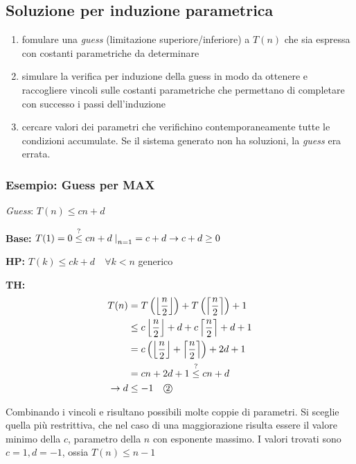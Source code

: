 \subsection{Soluzione per induzione parametrica}
\begin{enumerate}
    \item fomulare una \textit{guess} (limitazione superiore/inferiore) a $T(n)$ che sia espressa con costanti parametriche da determinare
    \item simulare la verifica per induzione della guess in modo da ottenere e raccogliere vincoli sulle costanti parametriche che permettano di completare con successo i passi dell'induzione
    \item cercare valori dei parametri che verifichino contemporaneamente tutte le condizioni accumulate. Se il sistema generato non ha soluzioni, la \textit{guess} era errata.
\end{enumerate}

\subsubsection{Esempio: Guess per MAX}
\textit{Guess}: $T(n) \leq cn+d$
\begin{description}
    \item{\textbf{Base:}} $T(1) = 0 \overset{?}{\leq} cn+d \left. \right|_{n=1} = c+d \rightarrow
            c+d\geq 0 $ 
    \item{\textbf{HP:}} $T(k) \leq ck+d \quad \forall k<n $ generico
    \item{\textbf{TH:}} 
        \begin{equation*}
            \begin{split}
                T(n) &=
                T \left( \left\lfloor \frac{n}{2} \right\rfloor \right) 
                + T \left( \left\lceil \frac{n}{2} \right\rceil \right) + 1 \\
                &\leq c \left\lfloor \frac{n}{2} \right\rfloor +d + c \left\lceil \frac{n}{2} \right\rceil +d + 1 \\
                &= c \left( \left\lfloor \frac{n}{2} \right\rfloor + \left\lceil \frac{n}{2} \right\rceil \right) +2d + 1 \\
                &= cn + 2d + 1 \overset{?}{\leq} cn+d \\
                \rightarrow d &\leq -1 \quad \mbox{\textcircled{\footnotesize 2}}
            \end{split}
        \end{equation*}
\end{description}
Combinando i vincoli  e  risultano possibili molte coppie di parametri. Si sceglie quella più restrittiva, che nel caso di una maggiorazione risulta essere il valore minimo della $c$, parametro della $n$ con esponente massimo.
I valori trovati sono $c=1, d=-1$, ossia $T(n) \leq n-1$

